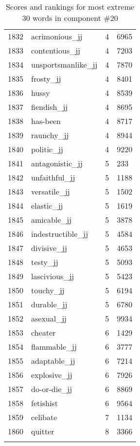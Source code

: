 \begin{longtable}[!htbp]{| rlr@{.}l |}
    1832 & acrimonious\_jj & 4 & 6965 \\
    1833 & contentious\_jj & 4 & 7203 \\
    1834 & unsportsmanlike\_jj & 4 & 7870 \\
    1835 & frosty\_jj & 4 & 8401 \\
    1836 & hussy & 4 & 8539 \\
    1837 & fiendish\_jj & 4 & 8695 \\
    1838 & has-been & 4 & 8717 \\
    1839 & raunchy\_jj & 4 & 8944 \\
    1840 & politic\_jj & 4 & 9220 \\
    1841 & antagonistic\_jj & 5 & 233 \\
    1842 & unfaithful\_jj & 5 & 1188 \\
    1843 & versatile\_jj & 5 & 1502 \\
    1844 & elastic\_jj & 5 & 1619 \\
    1845 & amicable\_jj & 5 & 3878 \\
    1846 & indestructible\_jj & 5 & 4584 \\
    1847 & divisive\_jj & 5 & 4653 \\
    1848 & testy\_jj & 5 & 5093 \\
    1849 & lascivious\_jj & 5 & 5423 \\
    1850 & touchy\_jj & 5 & 6194 \\
    1851 & durable\_jj & 5 & 6780 \\
    1852 & asexual\_jj & 5 & 9934 \\
    1853 & cheater & 6 & 1429 \\
    1854 & flammable\_jj & 6 & 3777 \\
    1855 & adaptable\_jj & 6 & 7214 \\
    1856 & explosive\_jj & 6 & 7926 \\
    1857 & do-or-die\_jj & 6 & 8869 \\
    1858 & fetishist & 6 & 9564 \\
    1859 & celibate & 7 & 1134 \\
    1860 & quitter & 8 & 3366 \\
    \hline
    \caption{Scores and rankings for most extreme 30 words in component \#20} \\
\end{longtable}
